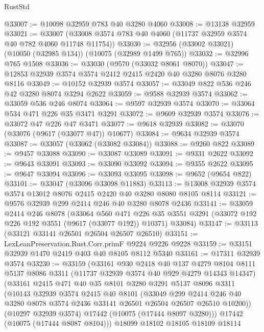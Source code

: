 \begin{lexlean}{RustStd}
\begin{coremodule}
@33007 := @10098 @32959 @783 @40 @3280 @4060
@33008 := @13138 @32959
@33021 := @33007 (@33008 @3574 @783 @40 @4060 (@11737 @32959 @3574 @40 @782 @4060 @11748 @11754))
@33030 := @32956 (@33002 @33021) (@10050 (@32985 @134)) (@10075 (@32989 @1499 @765))
@33032 := @32996 @765 @1508
@33036 := @33030 (@9570 (@33032 @8061 @8070))
@33047 := @12853 @32939 @3574 @3574 @2412 @2415 @2420 @40 @3280 @8076 @3280 @8116
@33049 := @10152 @32939 @3574
@33057 := @33049 @822 @536 @246 @42 @3280 @8074 @3294 @2622
@33059 := @9588 @32939 @3574
@33062 := @33059 @536 @246 @8074
@33064 := @9597 @32939 @3574
@33070 := @33064 @534 @471 @226 @35 @3471 @3291
@33072 := @9609 @32939 @3574
@33076 := @33072 @47 @226 @47 @3471
@33077 := @9618 @32939
@33082 := @33070 (@33076 (@9617 (@33077 @47)) @10677)
@33084 := @9634 @32939 @3574
@33087 := @33057 (@33062 (@33082 @33084))
@33088 := @9260 @822
@33089 := @9457 @33088
@33090 := @33087 @33089
@33091 := @9331 @2622
@33092 := @9643 @33091
@33093 := @33090 @33092
@33094 := @9355 @2622
@33095 := @9647 @33094
@33096 := @33093 @33095
@33098 := @9652 (@9654 @822)
@33101 := @33047 (@33096 @33098 @11883)
@33113 := @13008 @32939 @3574 @3574 @13012 @8076 @2415 @2420 @40 @3280 @8080 @8105 @8114
@33121 := @9576 @32939 @299 @2414 @246 @40 @3280 @8078 @2436
@33141 := @33059
    @2414
    @246
    @8078
    (@33064
      @560
      @471
      @226
      @35
      @3551
      @3291
      (@33072 @192 @226 @192 @3551 (@9617 (@33077 @192)) @10371)
      @33084)
@33147 := @33113 (@33121 @33141 @26501 @26504 @26507 @26510)
@33151 := LexLeanPreservation.Rust.Corr.primF @9224 @9226 @9228
@33159 := @33151 @32939 @1470 @2419 @403 @40 @8105 @8112 @5340
@33161 := @17311 @32939 @3574
@33230 := @33159
    (@33161
      @930
      @2418
      @40
      @137
      @4279
      @8104
      @8111
      @5137
      @8086
      @3311
      (@11737 @32939 @3574 @40 @929 @4279 @14343 @14347)
      (@33161
        @2415
        @471
        @40
        @35
        @8101
        @3280
        @3291
        @5137
        @8096
        @3311
        (@10143
          @32939
          @3574
          @2415
          @40
          @8101
          (@33049
            @299
            @2414
            @246
            @40
            @3280
            @8078
            @3574
            @2436
            @33141
            @26501
            @26504
            @26507
            @26510
            @10200))
        (@10297 @32939 @3574)
        @17442
        (@10075 (@17444 @8097 @3280)))
      @17442
      (@10075 (@17444 @8087 @8104)))
    @18099
    @18102
    @18105
    @18109
    @18114

\end{coremodule}
\end{lexlean}
